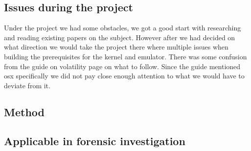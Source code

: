 \subsection{Issues during the project}
Under the project we had some obstacles, we got a good start with researching and 
reading existing papers on the subject. However after we had decided on what 
direction we would take the project there where multiple issues when building the 
prerequisites for the kernel and emulator. There was some confusion from the guide 
on volatility page on what to follow. Since the guide mentioned osx specifically we 
did not pay close enough attention to what we would have to deviate from it.
\subsection{Method}
\subsection{Applicable in forensic investigation}